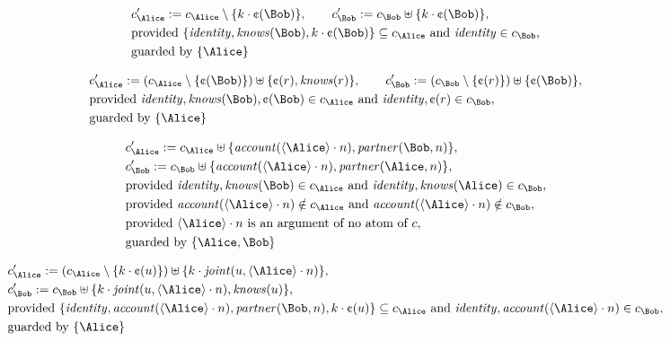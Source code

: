 \begin{align*}
&
c'_
{
\Alice
}
 := 
c_
{
\Alice
}
 \setminus 
\{
k
\cdot
\text{\textcent}
(
\Bob
)
\}
, \qquad 
c'_
{
\Bob
}
 := 
c_
{
\Bob
}
 \uplus 
\{
k
\cdot
\text{\textcent}
(
\Bob
)
\}
,\\
&
\text{provided } 
\{
\mathit{
identity
}
,
\mathit{
knows
}
(
\Bob
)
,
k
\cdot
\text{\textcent}
(
\Bob
)
\}
 \subseteq c_
{
\Alice
}
 \text{ and } 
\mathit{
identity
}
 \in c_
{
\Bob
}
,\\
&
\text{guarded by } \{
\Alice
\}
\end{align*}

\begin{align*}
&
c'_
{
\Alice
}
 := 
(c_
{
\Alice
}
 \setminus 
\{
\text{\textcent}
(
\Bob
)
\}
) \uplus 
\{
\text{\textcent}
(
r
)
,
\mathit{
knows
}
(
r
)
\}
, \qquad 
c'_
{
\Bob
}
 := 
(c_
{
\Bob
}
 \setminus 
\{
\text{\textcent}
(
r
)
\}
) \uplus 
\{
\text{\textcent}
(
\Bob
)
\}
,\\
&
\text{provided } 
\mathit{
identity
}
,
\mathit{
knows
}
(
\Bob
)
,
\text{\textcent}
(
\Bob
)
 \in c_
{
\Alice
}
 \text{ and } 
\mathit{
identity
}
,
\text{\textcent}
(
r
)
 \in c_
{
\Bob
}
,\\
&
\text{guarded by } \{
\Alice
\}
\end{align*}

\begin{align*}
&
c'_
{
\Alice
}
 := 
c_
{
\Alice
}
 \uplus 
\{
\mathit{
account
}
(
\langle
\Alice
\rangle
\cdot
n
)
,
\mathit{
partner
}
(
\Bob
,
n
)
\}
,\\
&
c'_
{
\Bob
}
 := 
c_
{
\Bob
}
 \uplus 
\{
\mathit{
account
}
(
\langle
\Alice
\rangle
\cdot
n
)
,
\mathit{
partner
}
(
\Alice
,
n
)
\}
,\\
&
\text{provided } 
\mathit{
identity
}
,
\mathit{
knows
}
(
\Bob
)
 \in c_
{
\Alice
}
 \text{ and } 
\mathit{
identity
}
,
\mathit{
knows
}
(
\Alice
)
 \in c_
{
\Bob
}
,\\
&
\text{provided } 
\mathit{
account
}
(
\langle
\Alice
\rangle
\cdot
n
)
 \notin c_
{
\Alice
}
 \text{ and } 
\mathit{
account
}
(
\langle
\Alice
\rangle
\cdot
n
)
 \notin c_
{
\Bob
}
,\\
&
\text{provided } 
\langle
\Alice
\rangle
\cdot
n
 \text{ is an argument of no atom of } c
,\\
&
\text{guarded by } \{
\Alice
,
\Bob
\}
\end{align*}

\begin{align*}
&
c'_
{
\Alice
}
 := 
(c_
{
\Alice
}
 \setminus 
\{
k
\cdot
\text{\textcent}
(
u
)
\}
) \uplus 
\{
k
\cdot
\mathit{
joint
}
(
u
,
\langle
\Alice
\rangle
\cdot
n
)
\}
,\\
&
c'_
{
\Bob
}
 := 
c_
{
\Bob
}
 \uplus 
\{
k
\cdot
\mathit{
joint
}
(
u
,
\langle
\Alice
\rangle
\cdot
n
)
,
\mathit{
knows
}
(
u
)
\}
,\\
&
\text{provided } 
\{
\mathit{
identity
}
,
\mathit{
account
}
(
\langle
\Alice
\rangle
\cdot
n
)
,
\mathit{
partner
}
(
\Bob
,
n
)
,
k
\cdot
\text{\textcent}
(
u
)
\}
 \subseteq c_
{
\Alice
}
 \text{ and } 
\mathit{
identity
}
,
\mathit{
account
}
(
\langle
\Alice
\rangle
\cdot
n
)
 \in c_
{
\Bob
}
,\\
&
\text{guarded by } \{
\Alice
\}
\end{align*}

